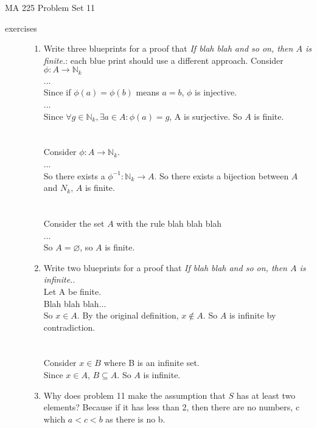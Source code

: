 \documentclass[11pt]{letter}
\theoremstyle{definition}
\begin{document}
\pagestyle{empty}

{\Large MA 225 Problem Set 11}\\


\begin{description}
\item[exercises]
	\begin{enumerate}
        \item Write three blueprints for a proof that {\em If blah blah and so on, then $A$ is finite.}: each blue print should use a different approach.
          Consider $\phi:A\rightarrow \mathbb{N}_k$\\
          ...\\
          Since if $\phi(a)=\phi(b)$ means $a=b$, $\phi$ is injective.\\
          ...\\
          Since $\forall g\in\mathbb{N}_k, \exists a\in A: \phi(a)=g$, A is surjective. So $A$ is finite.\\ \\ \\
          Consider $\phi:A\rightarrow \mathbb{N}_k$.\\
          ...\\
          So there exists a $\phi^{-1}:\mathbb{N}_k\rightarrow A$. So there exists a bijection between $A$ and $N_k$, $A$ is finite.\\ \\ \\
          Consider the set $A$ with the rule blah blah blah\\
          ...\\
          So $A=\varnothing$, so $A$ is finite.
          
          
		\item Write two blueprints for a proof that {\em If blah blah and so on, then $A$ is infinite.}. \\
                  Let A be finite.\\
                  Blah blah blah...\\
                  So $x\in A$. By the original definition, $x\notin A$. So $A$ is infinite by contradiction.  \\ \\ \\
                  Consider $x\in B$ where B is an infinite set.\\
                  Since $x\in A$, $B\subseteq A$. So $A$ is infinite.  
                  
		\item Why does problem 11 make the assumption that $S$ has at least two elements? Because if it has less than 2, then there are no numbers, c which $a<c<b$ as there is no b.
	\end{enumerate}


\end{description}
\end{document}

